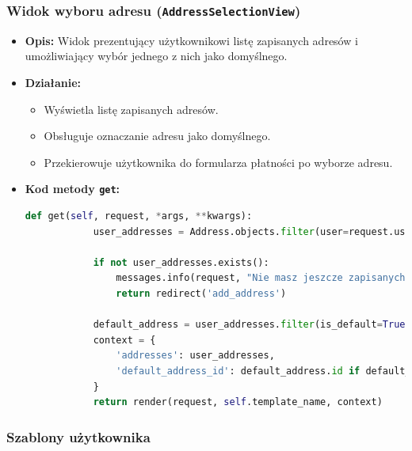 \documentclass[12pt,a4paper,oneside]{article}
\theoremstyle{definition}
\numberwithin{equation}{section}
\begin{document}
\subsubsection*{Widok wyboru adresu (\texttt{AddressSelectionView})}
\begin{itemize}
    \item \textbf{Opis:} Widok prezentujący użytkownikowi listę zapisanych adresów i umożliwiający wybór jednego z nich jako domyślnego.
    \item \textbf{Działanie:}
    \begin{itemize}
        \item Wyświetla listę zapisanych adresów.
        \item Obsługuje oznaczanie adresu jako domyślnego.
        \item Przekierowuje użytkownika do formularza płatności po wyborze adresu.
    \end{itemize}
    \item \textbf{Kod metody \texttt{get}:}
    \begin{lstlisting}[language=Python, caption=Metoda \texttt{get} w \texttt{AddressSelectionView}]
        def get(self, request, *args, **kwargs):
            user_addresses = Address.objects.filter(user=request.user)

            if not user_addresses.exists():
                messages.info(request, "Nie masz jeszcze zapisanych adresow. Dodaj nowy adres.")
                return redirect('add_address')

            default_address = user_addresses.filter(is_default=True).first()
            context = {
                'addresses': user_addresses,
                'default_address_id': default_address.id if default_address else None,
            }
            return render(request, self.template_name, context)
        \end{lstlisting}

\end{itemize}



\subsubsection{Szablony użytkownika}
\end{document}
